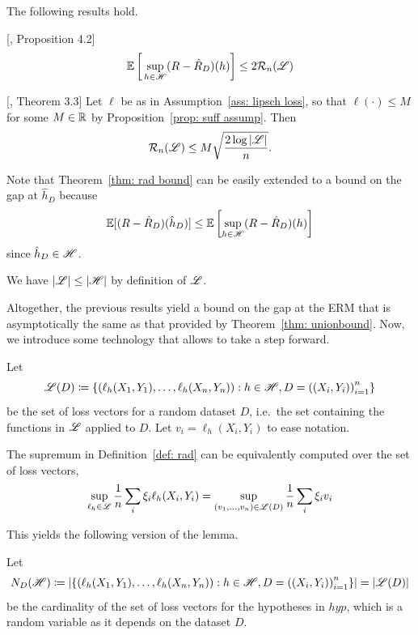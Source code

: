 \documentclass[reqno]{amsart}
\begin{document}
The following results hold. 

\begin{theorem}\label{thm: rad bound} [\cite{bach2024learning}, Proposition 4.2]
\[
\mathbb{E}\left[\,\sup_{h \in \mathscr{H}}(R - \hat R_D)(h)\right]
\le 2 \mathcal R_n(\mathscr{L})
\]
\end{theorem}

\begin{lemma}[Massart]\label{lemma: massart} [\cite{mohri2018foundations}, Theorem 3.3]
Let $\ell$ be as in Assumption~\ref{ass: lipsch loss}, so that $\ell(\cdot) \le M$ for some $M\in\mathbb{R}$ by Proposition~\ref{prop: suff assump}. Then
\[
\mathcal R_n(\mathscr{L}) \le M\sqrt{\frac{2\log \vert\mathscr{L}\vert}{n}}.
\]
\end{lemma}

Note that Theorem~\ref{thm: rad bound} can be easily extended to a bound on the gap at $\hat h_D$ because
\[
\mathbb{E}[(R - \hat R_D)(\hat h_D)] \le \mathbb{E}\left[\sup_{h \in \mathscr{H}}(R - \hat R_D)(h)\right]
\]
since $\hat h_D\in\mathscr{H}$. 

\begin{remark}
  We have $\vert\mathscr{L}\vert \le \vert\mathscr{H}\vert$ by definition of $\mathscr{L}$.
\end{remark}

Altogether, the previous results yield a bound on the gap at the ERM that is asymptotically the same as that provided by Theorem~\ref{thm: unionbound}. Now, we introduce some technology that allows to take a step forward. 

Let \[\mathscr{L}(D) \coloneq \left\{\left(\ell_h(X_1,Y_1),\ldots,\ell_h(X_n,Y_n)\right): h \in \mathscr{H}, D = {((X_i, Y_i))}_{i=1}^n \right\}\] be the set of loss vectors for a random dataset $D$, i.e.\ the set containing the functions in $\mathscr{L}$ applied to $D$. Let $v_i = \ell_h(X_i,Y_i)$ to ease notation. 

The supremum in Definition~\ref{def: rad} can be equivalently computed over the set of loss vectors,
\[
\sup_{\ell_h\in\mathscr{L}} \frac{1}{n}\sum_i \xi_i \ell_h(X_i,Y_i) = \sup_{(v_1,\ldots,v_n)\in\mathscr{L}(D)} \frac{1}{n}\sum_i \xi_i v_i
\]

This yields the following version of the lemma. 

Let \[N_D(\mathscr{H})\coloneq \left\vert\left\{\left(\ell_h(X_1,Y_1),\ldots,\ell_h(X_n,Y_n)\right) : h\in\mathscr{H}, D = {((X_i, Y_i))}_{i=1}^n\right\}\right\vert = \left\vert \mathscr{L}(D)\right\vert\] be the cardinality of the set of loss vectors for the hypotheses in $hyp$, which is a random variable as it depends on the dataset $D$.
\end{document}
